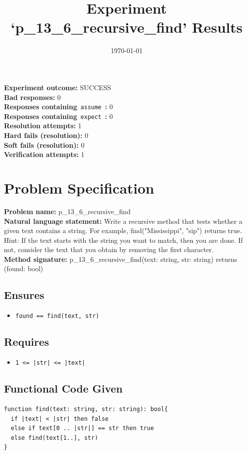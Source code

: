 \documentclass{article}
\begin{document}
\title{Experiment `p\_13\_6\_recursive\_find' Results}
\author{\today}
\date{}
\maketitle
\textbf{Experiment outcome: }SUCCESS
\\\textbf{Bad responses: }0
\\\textbf{Responses containing}~\texttt{assume}~\textbf{: }0
\\\textbf{Responses containing}~\texttt{expect}~\textbf{: }0
\\\textbf{Resolution attempts: }1
\\\textbf{Hard fails (resolution): }0
\\\textbf{Soft fails (resolution): }0
\\\textbf{Verification attempts: }1
\section*{Problem Specification}
\textbf{Problem name: }p\_13\_6\_recursive\_find
\\\textbf{Natural language statement: }Write a recursive method that tests whether a given text contains a string. For example, find("Mississippi", "sip") returns true. Hint: If the text starts with the string you want to match, then you are done. If not, consider the text that you obtain by removing the first character.
\\\textbf{Method signature: }p\_13\_6\_recursive\_find(text: string, str: string) returns (found: bool)
\subsection*{Ensures}
\begin{itemize}
\item \texttt{found == find(text, str)}
\end{itemize}
\subsection*{Requires}
\begin{itemize}
\item \texttt{1 <= |str| <= |text|}
\end{itemize}
\subsection*{Functional Code Given}
\begin{lstlisting}
function find(text: string, str: string): bool{
  if |text| < |str| then false
  else if text[0 .. |str|] == str then true
  else find(text[1..], str)
}
\end{lstlisting}
\clearpage
\end{document}
